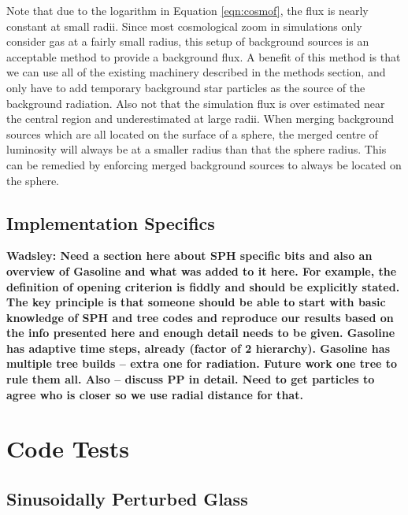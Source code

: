 \documentclass[fleq,usenatbib]{mnras}
\newcommand{\comment}[1]{\textbf{\color{red}#1}}
\begin{document}
Note that due to the logarithm in Equation \ref{eqn:cosmof}, the flux is 
nearly constant at small radii. Since most cosmological zoom in simulations 
only consider gas at a fairly small radius, this setup of background sources 
is an acceptable method to provide a background flux. A benefit of this method 
is that we can use all of the existing machinery described in the methods 
section, and only have to add temporary background star particles as the 
source of the background radiation. Also not that the simulation flux is over 
estimated near the central region and underestimated at large radii. When 
merging background sources which are all located on the surface of a sphere, 
the merged centre of luminosity will always be at a smaller radius than that 
the sphere radius. This can be remedied by enforcing merged background sources 
to always be located on the sphere. 

\subsection{Implementation Specifics}\label{sec:specs}
\comment{
Wadsley: Need a section here about SPH specific bits and also an overview of 
Gasoline and what was added to it here. For example, the definition of 
opening criterion is fiddly and should be explicitly stated. The key principle 
is that someone should be able to start with basic knowledge of SPH and tree 
codes and reproduce our results based on the info presented here and enough 
detail needs to be given. Gasoline has adaptive time steps, already (factor of 
2 hierarchy). Gasoline has multiple tree builds -- extra one for radiation. 
Future work one tree to rule them all. Also -- discuss PP in detail. Need to 
get particles to agree who is closer so we use radial distance for that.
}

\section{Code Tests}\label{sec:tsts}
\subsection{Sinusoidally Perturbed Glass}
\end{document}
